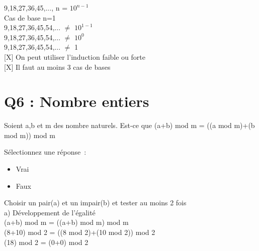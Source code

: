 \vspace{5mm} %

9,18,27,36,45,..., n = $10^{n-1}$  \\

Cas de base n=1 \\

9,18,27,36,45,54,... $\neq$ $10^{1-1}$  \\

9,18,27,36,45,54,... $\neq$ $10^{0}$  \\

9,18,27,36,45,54,... $\neq$ 1  \\

[X] On peut utiliser l’induction faible ou forte \\

[X] Il faut au moins 3 cas de bases \\


\newpage
\section{Q6 : Nombre entiers}

\vspace{5mm} %


Soient a,b et m des nombre naturels. Est-ce que (a+b) mod m = ((a mod m)+(b mod m)) mod m \\

\vspace{2mm} %

Sélectionnez une réponse :
\begin{itemize}[label=$\square$]
\item Vrai
\item Faux
\end{itemize}

\vspace{4mm} %

Choisir un pair(a) et un impair(b) et tester au moins 2 fois\\

a) Développement de l'égalité \\

(a+b) mod m = ((a+b) mod m) mod m \\

(8+10) mod 2 = ((8 mod 2)+(10 mod 2)) mod 2 \\

(18) mod 2 = (0+0) mod 2 \\

